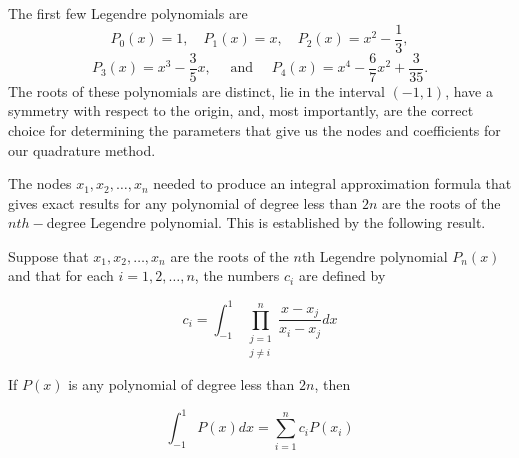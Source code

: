\documentclass[12pt,a4paper]{article}
\begin{document}
The first few Legendre polynomials are
\[P_0(x)=1,\quad P_1(x)=x,\quad P_2(x)=x^2-\frac13,\]
\[P_3(x)=x^3-\frac35x,\quad\mbox{ and } \quad P_4(x)=x^4-\frac67x^2+ \frac{3}{35}.\]
 The roots of these polynomials are distinct, lie in the interval $(-1,1)$, have a symmetry with respect to the origin, and, most importantly, are the correct choice for determining the parameters that give us the nodes and coefficients for our quadrature method.

The nodes $x_1, x_2, \ldots, x_n$ needed to produce an integral approximation formula that gives exact results for any polynomial of degree less than $2n$ are the roots of the $nth-$degree Legendre polynomial. This is established by the following result.

\begin{theorem}\label{thm:Legendpolythm1}
Suppose that $x_{1}, x_{2}, \ldots, x_{n}$ are the roots of the $n$th Legendre polynomial $P_{n}(x)$ and that for each $i=1,2, \ldots, n$, the numbers $c_{i}$ are defined by

$$
c_{i}=\int_{-1}^{1} \prod_{\substack{j=1 \\ j \neq i}}^{n} \frac{x-x_{j}}{x_{i}-x_{j}} d x
$$

If $P(x)$ is any polynomial of degree less than $2 n$, then

$$
\int_{-1}^{1} P(x) d x=\sum_{i=1}^{n} c_{i} P\left(x_{i}\right)
$$
\end{theorem}
\end{document}
